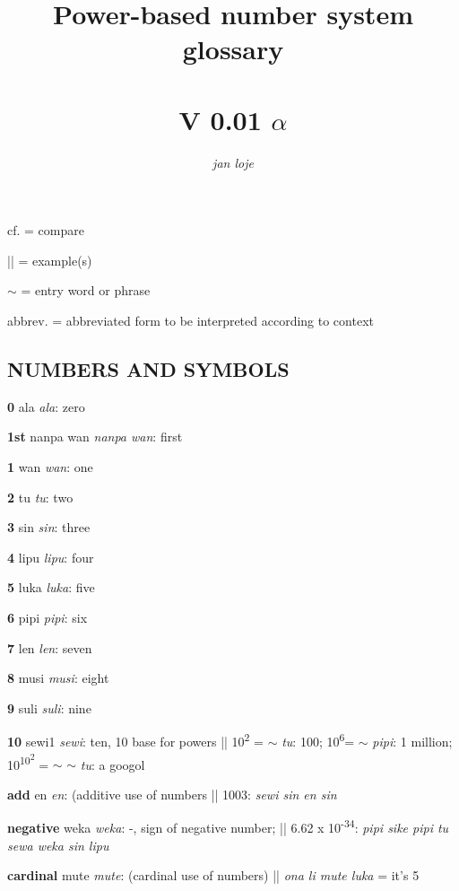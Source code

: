 \documentclass{article}
\title{Power-based number system glossary \\[1ex]{\HHUGE{\tpf lipu-nimi pi nasin nanpa sewi1}} \\ V 0.01 $\alpha$}
\author{\textit{jan loje}}
\begin{document}
\maketitle

\newcommand\tpDef[4]{\textbf{#1} {\Large\tpf #2} \textit{#3}: #4}


\newcommand\tpDefB[3]{\textbf{#1} {\Large\tpf #2}: \textit{#3}}

\setlength{\parskip}{0.3em}

cf. = compare

|| = example(s)

$\sim$ = entry word or phrase

abbrev. = abbreviated form to be interpreted according to context


\begin{multicols}{2}
\raggedright
\begin{hangparas}{1cm}{1}

\section*{NUMBERS AND SYMBOLS}

\tpDef {0}{ala}{ala}{zero}

\tpDef {1st}{nanpa wan}{nanpa wan}{first}

\tpDef {1}{wan}{wan}{one}

\tpDef {2}{tu}{tu}{two}

\tpDef {3}{sin}{sin}{three}

\tpDef {4}{lipu}{lipu}{four}

\tpDef {5}{luka}{luka}{five}

\tpDef {6}{pipi}{pipi}{six}

\tpDef {7}{len}{len}{seven}

\tpDef {8}{musi}{musi}{eight}

\tpDef {9}{suli}{suli}{nine}

\tpDef {10}{sewi1}{sewi}{ten, 10 base for powers || 10\textsuperscript{2} = $\sim$ \textit{tu}: 100;  10\textsuperscript{6}= $\sim$ \textit{pipi}: 1 million; 10\textsuperscript{10\textsuperscript{2}} = $\sim$ $\sim$ \textit{tu}: a googol }

\tpDef {add}{en}{en}{(additive use of numbers || 1003:\textit{ sewi sin en sin}}

\tpDef {negative}{weka}{weka}{-, sign of negative number; ||  6.62 x 10\textsuperscript{-34}: \textit{pipi sike pipi tu sewa weka sin lipu} }

\tpDef {cardinal}{mute}{mute}{(cardinal use of numbers) || \textit{ona li mute luka} = it's 5}


\end{hangparas}
\end{multicols}
\end{document}
